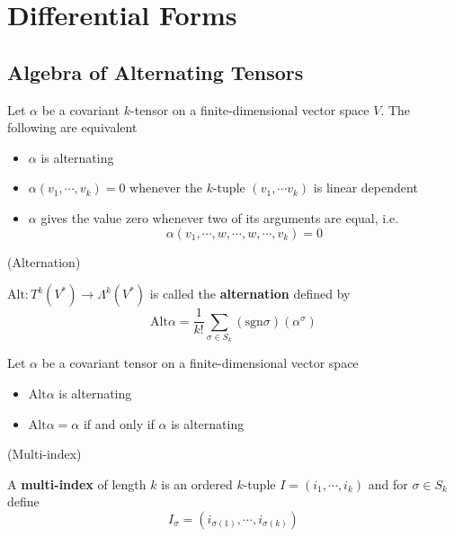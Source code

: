 \section{Differential Forms}

\subsection{Algebra of Alternating Tensors}

\begin{lemma}
    Let $\alpha$ be a covariant $k$-tensor on a finite-dimensional vector space $V$. The following are equivalent
    \begin{itemize}
        \item $\alpha$ is alternating
        \item $\alpha(v_1,\cdots,v_k) = 0$ whenever the $k$-tuple $(v_1,\cdots v_k)$ is linear dependent
        \item $\alpha$ gives the value zero whenever two of its arguments are equal, i.e. \[\alpha(v_1,\cdots,w,\cdots,w,\cdots,v_k)=0\]
    \end{itemize}
\end{lemma}

\begin{definition}(Alternation)\par
    $\text{Alt}:T^k(V^*) \to \Lambda^k(V^*)$ is called the \textbf{alternation} defined by
    \[\text{Alt}\alpha = \dfrac{1}{k!}\sum\limits_{\sigma\in S_k}(\text{sgn}\sigma)(\alpha^{\sigma})\]
\end{definition}

\begin{proposition}
    Let $\alpha$ be a covariant tensor on a finite-dimensional vector space
    \begin{itemize}
        \item $\text{Alt} \alpha$ is alternating
        \item $\text{Alt} \alpha = \alpha$ if and only if $\alpha$ is alternating
    \end{itemize}
\end{proposition}

\begin{definition}(Multi-index)\par
    A \textbf{multi-index} of length $k$ is an ordered $k$-tuple $I=(i_1,\cdots,i_k)$ and for $\sigma\in S_k$ define
    \[I_{\sigma} = (i_{\sigma(1)},\cdots,i_{\sigma(k)})\]
\end{definition}

